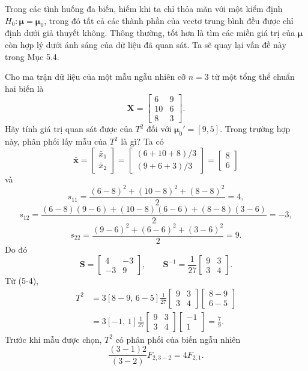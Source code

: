 Trong các tình huống đa biến, hiếm khi ta chỉ thỏa mãn với một kiểm định
\(H_0: \boldsymbol{\mu}=\boldsymbol{\mu}_0\), trong đó tất cả các thành phần của vectơ
trung bình đều được chỉ định dưới giả thuyết không. Thông thường, tốt hơn là tìm
các miền giá trị của \(\boldsymbol{\mu}\) còn hợp lý dưới ánh sáng của dữ liệu đã
quan sát. Ta sẽ quay lại vấn đề này trong Mục 5.4.

Cho ma trận dữ liệu của một mẫu ngẫu nhiên cỡ \(n=3\) từ một tổng thể chuẩn hai
biến là
\[
  \mathbf{X} =
  \begin{bmatrix}
    6 & 9 \\
    10 & 6 \\
    8 & 3
  \end{bmatrix}.
\]
Hãy tính giá trị quan sát được của \(T^2\) đối với
\(\boldsymbol{\mu}_0' = [9,5]\). Trong trường hợp này, phân phối lấy mẫu của
\(T^2\) là gì? Ta có
\[
  \bar{\mathbf{x}}
  = \begin{bmatrix} \bar{x}_1 \\ \bar{x}_2 \end{bmatrix}
  = \begin{bmatrix}
      (6+10+8)/3 \\
      (9+6+3)/3
    \end{bmatrix}
  = \begin{bmatrix} 8 \\ 6 \end{bmatrix}
\]
và
\[
  s_{11}=\frac{(6-8)^2+(10-8)^2+(8-8)^2}{2}=4,
\]
\[
  s_{12}=\frac{(6-8)(9-6)+(10-8)(6-6)+(8-8)(3-6)}{2}=-3,
\]
\[
  s_{22}=\frac{(9-6)^2+(6-6)^2+(3-6)^2}{2}=9.
\]
Do đó
\[
  \mathbf{S}=
  \begin{bmatrix}
    4 & -3 \\
    -3 & 9
  \end{bmatrix},
  \qquad
  \mathbf{S}^{-1}
  = \frac{1}{27}
  \begin{bmatrix}
    9 & 3 \\
    3 & 4
  \end{bmatrix}.
\]
Từ (5-4),
\[
\begin{aligned}
  T^2
  &= 3[8-9,\,6-5]
    \frac{1}{27}
    \begin{bmatrix} 9 & 3 \\ 3 & 4 \end{bmatrix}
    \begin{bmatrix} 8-9 \\ 6-5 \end{bmatrix} \\
  &= 3[-1,\,1]\frac{1}{27}
    \begin{bmatrix} 9 & 3 \\ 3 & 4 \end{bmatrix}
    \begin{bmatrix} -1 \\ 1 \end{bmatrix}
  = \frac{7}{9}.
\end{aligned}
\]
Trước khi mẫu được chọn, \(T^2\) có phân phối của biến ngẫu nhiên
\[
  \frac{(3-1)2}{(3-2)}F_{2,3-2} = 4F_{2,1}.
\]


